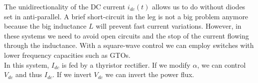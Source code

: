 	The unidirectionality of the DC current $i_{dc}(t)$ allows us to do without diodes set in anti-parallel. A brief short-circuit in the leg is not a big problem anymore because the big inductance $L$ will prevent fast current variations. However, in these systems we need to avoid open circuits and the stop of the current flowing through the inductance. With a square-wave control we can employ switches with lower frequency capacities such as GTOs. \\
	
    In this system, $I_{dc}$ is fed by a thyristor rectifier. If we modify $\alpha$, we can control $V_{dc}$ and thus $I_{dc}$. If we invert $V_{dc}$ we can invert the power flux. 